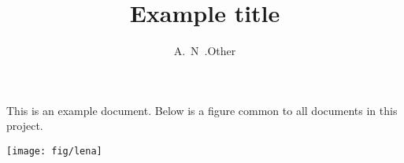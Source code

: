 \documentclass[a4paper]{paper}
\title{Example title}
\author{A.~N~.Other}
\begin{document}
\maketitle

This is an example document. Below is a figure common to all documents in this
project.

\texttt{[image: fig/lena]}
\end{document}
